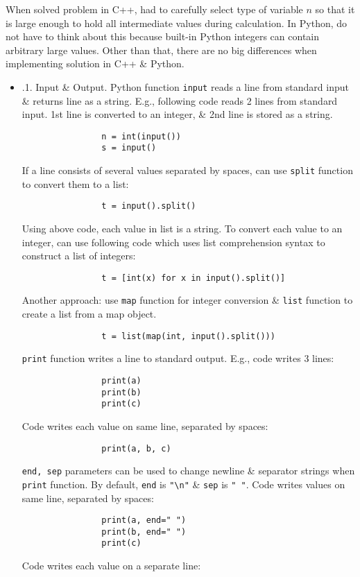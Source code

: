 \documentclass{article}
\begin{document}
\begin{itemize}
\begin{itemize}
		When solved problem in C++, had to carefully select type of variable $n$ so that it is large enough to hold all intermediate values during calculation. In Python, do not have to think about this because built-in Python integers can contain arbitrary large values. Other than that, there are no big differences when implementing solution in C++ \& Python.
		\begin{itemize}
			\item {.1. Input \& Output.} Python function {\tt input} reads a line from standard input \& returns line as a string. E.g., following code reads 2 lines from standard input. 1st line is converted to an integer, \& 2nd line is stored as a string.
			\begin{verbatim}
				n = int(input())
				s = input()
			\end{verbatim}
			If a line consists of several values separated by spaces, can use {\tt split} function to convert them to a list:
			\begin{verbatim}
				t = input().split()
			\end{verbatim}
			Using above code, each value in list is a string. To convert each value to an integer, can use following code which uses list comprehension syntax to construct a list of integers:
			\begin{verbatim}
				t = [int(x) for x in input().split()]
			\end{verbatim}
			Another approach: use {\tt map} function for integer conversion \& {\tt list} function to create a list from a map object.
			\begin{verbatim}
				t = list(map(int, input().split()))
			\end{verbatim}
			{\tt print} function writes a line to standard output. E.g., code writes 3 lines:
			\begin{verbatim}
				print(a)
				print(b)
				print(c)
			\end{verbatim}
			Code writes each value on same line, separated by spaces:
			\begin{verbatim}
				print(a, b, c)
			\end{verbatim}
			{\tt end, sep} parameters can be used to change newline \& separator strings when {\tt print} function. By default, {\tt end} is \verb|"\n"| \& {\tt sep} is {\tt" "}. Code writes values on same line, separated by spaces:
			\begin{verbatim}
				print(a, end=" ")
				print(b, end=" ")
				print(c)
			\end{verbatim}
			Code writes each value on a separate line:

\end{itemize}
\end{itemize}
\end{itemize}
\end{document}
